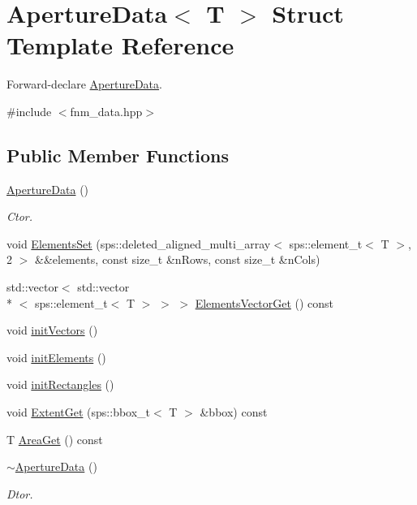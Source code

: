\hypertarget{singletonfnm_1_1ApertureData}{\section{Aperture\+Data$<$ T $>$ Struct Template Reference}
\label{singletonfnm_1_1ApertureData}
}


Forward-\/declare \hyperlink{singletonfnm_1_1ApertureData}{Aperture\+Data}.  




{\ttfamily \#include $<$fnm\+\_\+data.\+hpp$>$}

\subsection*{Public Member Functions}
\begin{DoxyCompactItemize}
\item 
\hyperlink{singletonfnm_1_1ApertureData_a0475f185fc298554a7f24b0c919e2e72}{Aperture\+Data} ()
\begin{DoxyCompactList}\small\item\em Ctor. \end{DoxyCompactList}\item 
void \hyperlink{singletonfnm_1_1ApertureData_afc99a3f0eb0c1255976b8a422a1aa4c5}{Elements\+Set} (sps\+::deleted\+\_\+aligned\+\_\+multi\+\_\+array$<$ sps\+::element\+\_\+t$<$ T $>$, 2 $>$ \&\&elements, const size\+\_\+t \&n\+Rows, const size\+\_\+t \&n\+Cols)
\item 
std\+::vector$<$ std\+::vector\\*
$<$ sps\+::element\+\_\+t$<$ T $>$ $>$ $>$ \hyperlink{singletonfnm_1_1ApertureData_af4d860345419b7eb270a0277281fa557}{Elements\+Vector\+Get} () const 
\item 
void \hyperlink{singletonfnm_1_1ApertureData_ac459bb07eae2d1cc9468bde090282467}{init\+Vectors} ()
\item 
void \hyperlink{singletonfnm_1_1ApertureData_aaed1a8deb647bf6ffb6d6b5727f02811}{init\+Elements} ()
\item 
void \hyperlink{singletonfnm_1_1ApertureData_ad5ffcad99b14536d418142d8eaa99e50}{init\+Rectangles} ()
\item 
void \hyperlink{singletonfnm_1_1ApertureData_a47622b69bb7046911e7ce1e3d3022ea2}{Extent\+Get} (sps\+::bbox\+\_\+t$<$ T $>$ \&bbox) const 
\item 
T \hyperlink{singletonfnm_1_1ApertureData_a5a2beeb4beb4cdac3ee643598eb43421}{Area\+Get} () const 
\item 
\hyperlink{singletonfnm_1_1ApertureData_afe001570c0e0fd80f0cad1064f216980}{$\sim$\+Aperture\+Data} ()
\begin{DoxyCompactList}\small\item\em Dtor. \end{DoxyCompactList}\end{DoxyCompactItemize}
